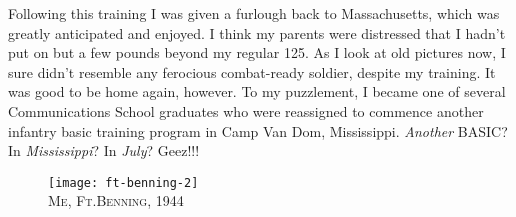 \documentclass[../m3y]{subfiles}
\begin{document}
Following this training I was given a furlough back to Massachusetts, which was greatly anticipated and enjoyed. I think my parents were distressed that I hadn't put on but a few pounds beyond my regular 125. As I look at old pictures now, I sure didn't resemble any ferocious combat-ready soldier, despite my training. It was good to be home again, however. To my puzzlement, I became one of several Communications School graduates who were reassigned to commence another infantry basic training program in Camp Van Dom, Mississippi. \emph{Another} BASIC? In \emph{Mississippi}? In \emph{July}? Geez!!!

\begin{figure}[p]
\centering
\texttt{[image: ft-benning-2]}\\
\medskip
{\newtimes\textsc{Me, Ft.\thinspace{}Benning, 1944}}
\end{figure}
\end{document}
